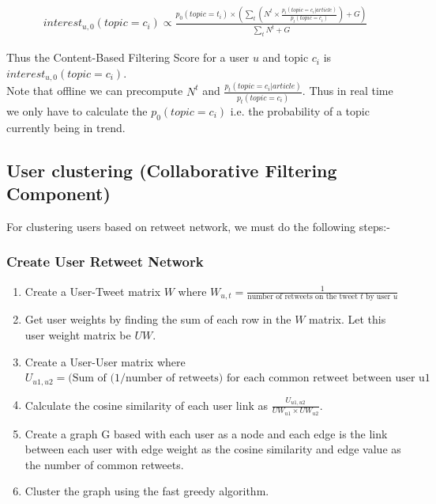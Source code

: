 \documentclass{article}
\begin{document}
\begin{equation}
\begin{aligned}
interest_{u,0}(topic = c_i) \propto \displaystyle\frac{p_0(topic = t_i) \times \left(\sum_{t} \left(N^t \times \displaystyle\frac{p_t(topic = c_i| article)}{p_t(topic = c_i)}\right) + G\right)}{\sum_{t} N^t + G }
\end{aligned}
\end{equation}

Thus the Content-Based Filtering Score for a user $u$ and topic $c_i$ is $interest_{u,0}(topic = c_i)$. \\
Note that offline we can precompute $N^t$ and $\displaystyle\frac{p_t(topic =c_i| article)}{p_t(topic = c_i)}$. Thus in real time we only have to calculate the $p_0(topic = c_i)$ i.e. the probability of a topic currently being in trend. \\

\subsection{User clustering (Collaborative Filtering Component)}

For clustering users based on retweet network, we must do the following steps:-

\subsubsection{Create User Retweet Network}

\begin{enumerate}
\item Create a User-Tweet matrix $W$ where $W_{u, t} = \displaystyle\frac{1}{\textrm{number of retweets on the tweet $t$ by user $u$}}$
\item Get user weights by finding the sum of each row in the $W$ matrix. Let this user weight matrix be $UW$.
\item Create a User-User matrix where $U_{u1, u2} = \textrm{(Sum of (1/number of retweets) for each common retweet between user u1 and u2)}$ 
\item Calculate the cosine similarity of each user link as $\displaystyle\frac{U_{u1, u2}}{UW_{u1} \times UW_{u2}}$.
\item Create a graph G based with each user as a node and each edge is the link between each user with edge weight as the cosine similarity and edge value as the number of common retweets.
\item Cluster the graph using the fast greedy algorithm. 
\end{enumerate}
\end{document}
